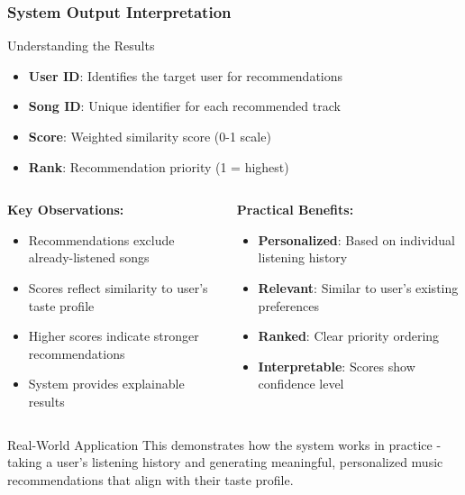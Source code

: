 \documentclass[11pt]{beamer}
\begin{document}
\begin{frame}
\frametitle{System Output Interpretation}
\begin{block}{Understanding the Results}
\begin{itemize}
\item \textbf{User ID}: Identifies the target user for recommendations
\item \textbf{Song ID}: Unique identifier for each recommended track
\item \textbf{Score}: Weighted similarity score (0-1 scale)
\item \textbf{Rank}: Recommendation priority (1 = highest)
\end{itemize}
\end{block}

\begin{columns}
\begin{column}{0.5\textwidth}
\textbf{Key Observations:}
\begin{itemize}
\item Recommendations exclude already-listened songs
\item Scores reflect similarity to user's taste profile
\item Higher scores indicate stronger recommendations
\item System provides explainable results
\end{itemize}
\end{column}
\begin{column}{0.5\textwidth}
\textbf{Practical Benefits:}
\begin{itemize}
\item \textbf{Personalized}: Based on individual listening history
\item \textbf{Relevant}: Similar to user's existing preferences
\item \textbf{Ranked}: Clear priority ordering
\item \textbf{Interpretable}: Scores show confidence level
\end{itemize}
\end{column}
\end{columns}

\begin{block}{Real-World Application}
This demonstrates how the system works in practice - taking a user's listening history and generating meaningful, personalized music recommendations that align with their taste profile.
\end{block}
\end{frame}
\end{document}
